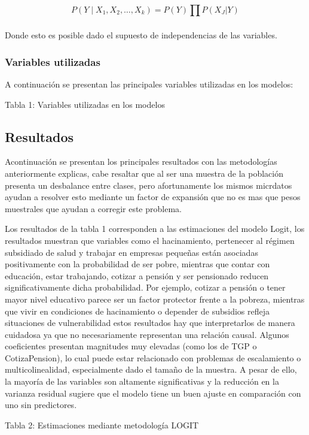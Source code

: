 \documentclass[12pt,a4paper,onecolumn]{article}
\begin{document}
$$P\left( Y \middle| X_{1},X_{2},\ldots,X_{k} \right) = P(Y)\prod_{}^{}{P(X_{J}|Y)}$$

Donde esto es posible dado el supuesto de independencias de las variables.

\subsubsection{Variables utilizadas}
A continuación se presentan las principales variables utilizadas en los modelos:

{\color{blue} Tabla 1: Variables utilizadas en los modelos}

\subsection{Resultados}

Acontinuación se presentan los principales resultados con las metodologías anteriormente explicas, cabe resaltar que al ser una muestra de la población presenta un desbalance entre clases, pero afortunamente los mismos micrdatos ayudan a resolver esto mediante un factor de expansión que no es mas que pesos muestrales que ayudan a corregir este problema.

Los resultados de la tabla 1 corresponden a las estimaciones del modelo Logit, los resultados muestran que variables como el hacinamiento, pertenecer al régimen subsidiado de salud y trabajar en empresas pequeñas están asociadas positivamente con la probabilidad de ser pobre, mientras que contar con educación, estar trabajando, cotizar a pensión y ser pensionado reducen significativamente dicha probabilidad. Por ejemplo, cotizar a pensión o tener mayor nivel educativo parece ser un factor protector frente a la pobreza, mientras que vivir en condiciones de hacinamiento o depender de subsidios refleja situaciones de vulnerabilidad estos resultados hay que interpretarlos de manera cuidadosa ya que no necesariamente representan una relación causal. Algunos coeficientes presentan magnitudes muy elevadas (como los de TGP o CotizaPension), lo cual puede estar relacionado con problemas de escalamiento o multicolinealidad, especialmente dado el tamaño de la muestra. A pesar de ello, la mayoría de las variables son altamente significativas y la reducción en la varianza residual sugiere que el modelo tiene un buen ajuste en comparación con uno sin predictores.

{\color{blue} Tabla 2: Estimaciones mediante metodología LOGIT}
\end{document}
